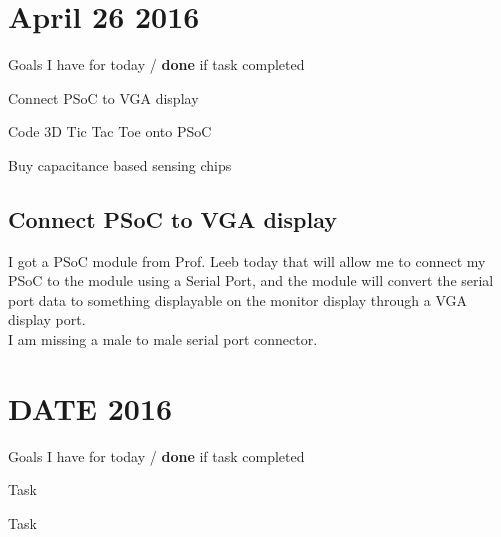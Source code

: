 \documentclass[12pt,twoside]{article}
\newenvironment{tight_itemize}{
\begin{itemize}
  \setlength{\itemsep}{0pt}
  \setlength{\parskip}{0pt}
}{\end{itemize}}
\begin{document}

\newpage
\section{April 26 2016}

Goals I have for today / {\bf done} if task completed
\begin{tight_itemize}
\item Connect PSoC to VGA display %
\item Code 3D Tic Tac Toe onto PSoC
\item Buy capacitance based sensing chips
\end{tight_itemize}

\subsection{Connect PSoC to VGA display}
I got a PSoC module from Prof. Leeb today that will allow me to connect my PSoC to the module using a Serial Port, and the module will convert the serial port data to something displayable on the monitor display through a VGA display port. 
\\ I am missing a male to male serial port connector. 


\newpage
\section{DATE 2016}

Goals I have for today / {\bf done} if task completed
\begin{tight_itemize}
\item Task %
\item Task 
\end{tight_itemize}
\end{document}
